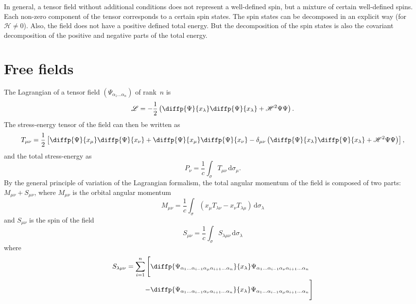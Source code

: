 \documentclass{article}
\newcommand{\HH}{\mathscr{H}}
\newcommand{\LL}{\mathscr{L}}
\renewcommand{\d}{\,\mathrm{d}}
\begin{document}
In general, a tensor field without additional conditions does not represent a well-defined spin, but a mixture of certain well-defined spins.
Each non-zero component of the tensor corresponds to a certain spin states.
The spin states can be decomposed in an explicit way (for $\HH\neq0$).
Also, the field does not have a positive defined total energy.
But the decomposition of the spin states is also the covariant decomposition of the positive and negative parts of the total energy.


\section{Free fields}
\label{section1}

The Lagrangian of a tensor field $(\Psi_{\alpha_1\ldots\alpha_n})$ of rank~$n$ is
\[
  \LL = -\frac12\left(
    \diffp{\Psi}{{x_\lambda}} \diffp{\Psi}{{x_\lambda}} + \HH^2\Psi\Psi
  \right).
\]
The stress-energy tensor of the field can then be written as
\[
  T_{\mu\nu} = \frac12\left[
    \diffp{\Psi}{{x_\mu}} \diffp{\Psi}{{x_\nu}}
    + \diffp{\Psi}{{x_\mu}} \diffp{\Psi}{{x_\nu}}
    -\delta_{\mu\nu}\left(
      \diffp{\Psi}{{x_\lambda}} \diffp{\Psi}{{x_\lambda}} + \HH^2\Psi\Psi
    \right)
  \right],
\]
and the total stress-energy as
\[
  P_\nu = \frac1c \int_\sigma T_{\mu\nu}\d\sigma_\mu.
\]
By the general principle of variation of the Lagrangian formalism, the total angular momentum of the field is composed of two parts: $M_{\mu\nu}+S_{\mu\nu}$, where $M_{\mu\nu}$ is the orbital angular momentum
\[
  M_{\mu\nu} = \frac1c \int_\sigma (x_\mu T_{\lambda\nu} - x_\nu T_{\lambda\mu}) \d\sigma_\lambda
\]
and $S_{\mu\nu}$ is the spin of the field
\[
  S_{\mu\nu} = \frac1c \int_\sigma S_{\lambda\mu\nu} \d\sigma_\lambda
\]
where
\begin{align*}
  S_{\lambda\mu\nu} = \sum_{i=1}^n \Bigg[
    &\diffp{{\Psi_{\alpha_1\ldots\alpha_{i-1}\alpha_\mu\alpha_{i+1}\ldots\alpha_n}}}{{x_\lambda}} \Psi_{\alpha_1\ldots\alpha_{i-1}\alpha_\nu\alpha_{i+1}\ldots\alpha_n}
    \\-&
    \diffp{{\Psi_{\alpha_1\ldots\alpha_{i-1}\alpha_\nu\alpha_{i+1}\ldots\alpha_n}}}{{x_\lambda}} \Psi_{\alpha_1\ldots\alpha_{i-1}\alpha_\mu\alpha_{i+1}\ldots\alpha_n}
  \Bigg]
\end{align*}
\end{document}
